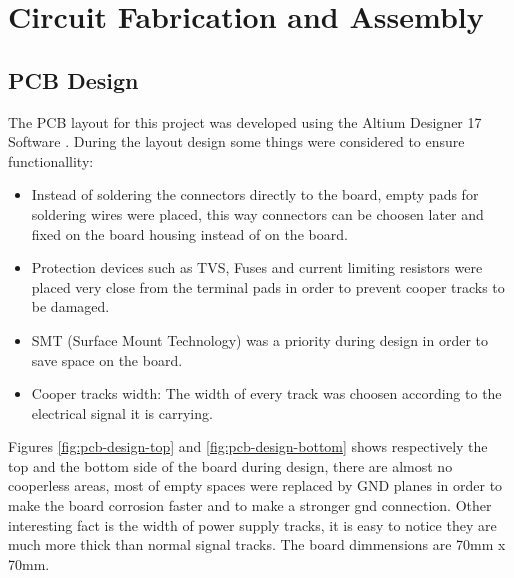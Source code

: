 \section{Circuit Fabrication and Assembly}\label{sec:printed-circuit-board}

	\subsection{PCB Design}\label{ssec:pcb-design}

		The PCB layout for this project was developed using the Altium Designer 17 Software \cite{AD17}. During the layout design some things were considered to ensure functionallity:

		\begin{itemize}
			\item Instead of soldering the connectors directly to the board, empty pads for soldering wires were placed, this way connectors can be choosen later and fixed on the board housing instead of on the board.\label{itm:pcb-pin-bars}
			\item Protection devices such as TVS, Fuses and current limiting resistors were placed very close from the terminal pads in order to prevent cooper tracks to be damaged.\label{itm:pcb-protection}
			\item SMT (Surface Mount Technology) was a priority during design in order to save space on the board.\label{itm:pcb-smt}
			\item Cooper tracks width: The width of every track was choosen according to the electrical signal it is carrying.\label{itm:pcb-track}
 		\end{itemize}

 		Figures \ref{fig:pcb-design-top} and \ref{fig:pcb-design-bottom} shows respectively the top and the bottom side of the board during design, there are almost no cooperless areas, most of empty spaces were replaced by GND planes in order to make the board corrosion faster and to make a stronger gnd connection. Other interesting fact is the width of power supply tracks, it is easy to notice they are much more thick than normal signal tracks. The board dimmensions are 70mm x 70mm.

